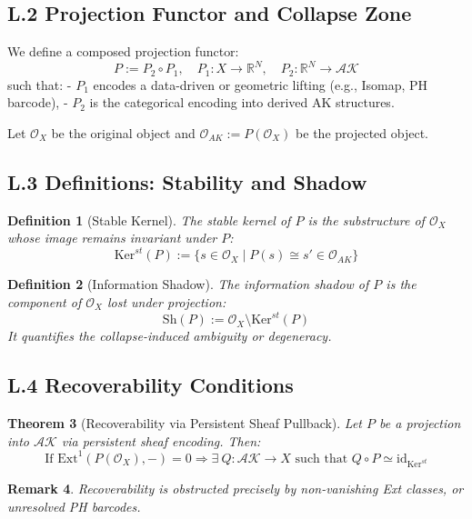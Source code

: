 \documentclass[11pt]{article}
\newtheorem{theorem}{Theorem}[section]
\newtheorem{definition}[theorem]{Definition}
\newtheorem{remark}[theorem]{Remark}
\begin{document}
\subsection*{L.2 Projection Functor and Collapse Zone}

We define a composed projection functor:
\[
P := P_2 \circ P_1,\quad P_1: X \to \mathbb{R}^N,\quad P_2: \mathbb{R}^N \to \mathcal{AK}
\]
such that:
- $P_1$ encodes a data-driven or geometric lifting (e.g., Isomap, PH barcode),
- $P_2$ is the categorical encoding into derived AK structures.

Let $\mathcal{O}_X$ be the original object and $\mathcal{O}_{AK} := P(\mathcal{O}_X)$ be the projected object.

\subsection*{L.3 Definitions: Stability and Shadow}

\begin{definition}[Stable Kernel]
The \emph{stable kernel} of $P$ is the substructure of $\mathcal{O}_X$ whose image remains invariant under $P$:
\[
\mathrm{Ker}^{st}(P) := \{ s \in \mathcal{O}_X \mid P(s) \cong s' \in \mathcal{O}_{AK} \}
\]
\end{definition}

\begin{definition}[Information Shadow]
The \emph{information shadow} of $P$ is the component of $\mathcal{O}_X$ lost under projection:
\[
\mathrm{Sh}(P) := \mathcal{O}_X \setminus \mathrm{Ker}^{st}(P)
\]
It quantifies the collapse-induced ambiguity or degeneracy.
\end{definition}

\subsection*{L.4 Recoverability Conditions}

\begin{theorem}[Recoverability via Persistent Sheaf Pullback]
Let $P$ be a projection into $\mathcal{AK}$ via persistent sheaf encoding. Then:
\[
\text{If } \mathrm{Ext}^1(P(\mathcal{O}_X), -) = 0 \Rightarrow \exists\ Q: \mathcal{AK} \to X \text{ such that } Q \circ P \simeq \mathrm{id}_{\mathrm{Ker}^{st}}
\]
\end{theorem}

\begin{remark}
Recoverability is obstructed precisely by non-vanishing Ext classes, or unresolved PH barcodes.
\end{remark}
\end{document}
